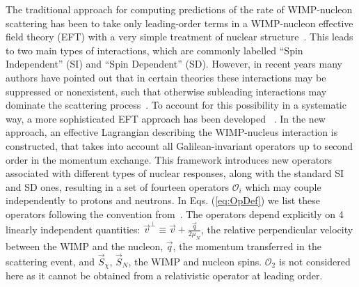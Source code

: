 The traditional approach for computing predictions of the rate of WIMP-nucleon scattering has been to take only leading-order terms in a WIMP-nucleon effective field theory (EFT) with a very simple treatment of nuclear structure~\cite{LEWIN}. This leads to two main types of interactions, which are commonly labelled ``Spin Independent'' (SI) and ``Spin Dependent'' (SD). However, in recent years many authors have pointed out that in certain theories these interactions may be suppressed or nonexistent, such that otherwise subleading interactions may dominate the scattering process~\cite{Chang:2009yt}. To account for this possibility in a systematic way, a more sophisticated EFT approach has been developed ~\cite{Fitzpatrick:2012ib,Anand:MathTools,Fitzpatrick:MathTools}. In the new approach, an effective Lagrangian describing the WIMP-nucleus interaction is constructed, that takes into account all Galilean-invariant operators up to second order in the momentum exchange. This framework introduces new operators associated with different types of nuclear responses, along with the standard SI and SD ones, resulting in a set of fourteen operators $\mathcal{O}_i$ which may couple independently to protons and neutrons. In Eqs. (\ref{eq:OpDef}) we list these operators following the convention from~\cite{Anand:MathTools}. The operators depend explicitly on 4 linearly independent quantities: $\vec{v}^{\perp} \equiv \vec{v} + \frac{\vec{q}}{2\mu_N} $, the relative perpendicular velocity between the WIMP and the nucleon, $\vec{q}$, the momentum transferred in the scattering event, and $\vec{S}_\chi$, $\vec{S}_N$, the WIMP and nucleon spins. $\mathcal{O}_2$ is not considered here as it cannot be obtained from a relativistic operator at leading order.
%

